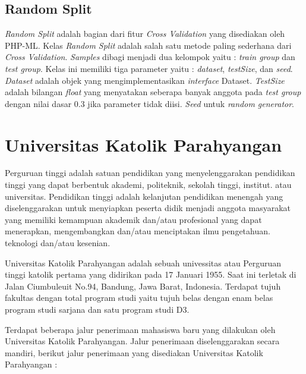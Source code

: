 \subsection{Random Split}
\textit{Random Split} adalah bagian dari fitur \textit{Cross Validation} yang disediakan oleh PHP-ML. Kelas \textit{Random Split} adalah salah satu metode paling sederhana dari \textit{Cross Validation}. \textit{Samples} dibagi menjadi dua kelompok yaitu : \textit{train group} dan \textit{test group}. Kelas ini memiliki tiga parameter yaitu : \textit{dataset}, \textit{testSize}, dan \textit{seed}. \textit{Dataset} adalah objek yang mengimplementasikan \textit{interface} Dataset. \textit{TestSize} adalah bilangan \textit{float} yang menyatakan seberapa banyak anggota pada \textit{test group} dengan nilai dasar 0.3 jika parameter tidak diisi. \textit{Seed} untuk \textit{random generator}.

\section{Universitas Katolik Parahyangan}
\label{sec:unpar}

Perguruan tinggi adalah satuan pendidikan yang menyelenggarakan pendidikan tinggi yang dapat berbentuk akademi, politeknik, sekolah tinggi, institut. atau universitas. Pendidikan tinggi adalah kelanjutan pendidikan menengah yang diselenggarakan untuk menyiapkan peserta didik menjadi anggota masyarakat yang memiliki kemampuan akademik dan/atau profesional yang dapat menerapkan, mengembangkan dan/atau menciptakan ilmu pengetahuan. teknologi dan/atau kesenian. %

Universitas Katolik Parahyangan adalah sebuah univessitas atau Perguruan tinggi katolik pertama yang didirikan pada 17 Januari 1955. Saat ini terletak di Jalan Ciumbuleuit No.94, Bandung, Jawa Barat, Indonesia. Terdapat tujuh fakultas dengan total program studi yaitu tujuh belas dengan enam belas program studi sarjana dan satu program studi D3. %

Terdapat beberapa jalur penerimaan mahasiswa baru yang dilakukan oleh Universitas Katolik Parahyangan. Jalur penerimaan diselenggarakan secara mandiri, berikut jalur penerimaan yang disediakan Universitas Katolik Parahyangan :

